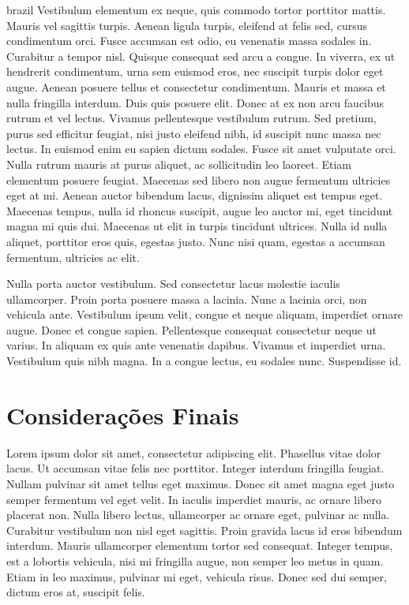 \begin{otherlanguage*}{brazil}
        Vestibulum elementum ex neque, quis commodo tortor porttitor
        mattis. Mauris vel sagittis turpis. Aenean ligula turpis, eleifend at felis sed, cursus
        condimentum orci. Fusce accumsan est odio, eu venenatis massa sodales in. Curabitur a tempor
        nisl. Quisque consequat sed arcu a congue. In viverra, ex ut hendrerit condimentum, urna sem
        euismod eros, nec suscipit turpis dolor eget augue. Aenean posuere tellus et consectetur
        condimentum. Mauris et massa et nulla fringilla interdum. Duis quis posuere elit. Donec at
        ex non arcu faucibus rutrum et vel lectus. Vivamus pellentesque vestibulum rutrum. Sed
        pretium, purus sed efficitur feugiat, nisi justo eleifend nibh, id suscipit nunc massa nec
        lectus. In euismod enim eu sapien dictum sodales. Fusce sit amet vulputate orci. Nulla
        rutrum mauris at purus aliquet, ac sollicitudin leo laoreet. Etiam elementum posuere
        feugiat. Maecenas sed libero non augue fermentum ultricies eget at mi. Aenean auctor
        bibendum lacus, dignissim aliquet est tempus eget. Maecenas tempus, nulla id rhoncus
        suscipit, augue leo auctor mi, eget tincidunt magna mi quis dui. Maecenas ut elit in turpis
        tincidunt ultrices. Nulla id nulla aliquet, porttitor eros quis, egestas justo. Nunc nisi
        quam, egestas a accumsan fermentum, ultricies ac elit.

        Nulla porta auctor vestibulum. Sed
        consectetur lacus molestie iaculis ullamcorper. Proin porta posuere massa a lacinia. Nunc a
        lacinia orci, non vehicula ante. Vestibulum ipsum velit, congue et neque aliquam, imperdiet
        ornare augue. Donec et congue sapien. Pellentesque consequat consectetur neque ut varius. In
        aliquam ex quis ante venenatis dapibus. Vivamus et imperdiet urna. Vestibulum quis nibh
        magna. In a congue lectus, eu sodales nunc. Suspendisse id.

        \section*{Considerações Finais}
        Lorem ipsum dolor sit amet, consectetur adipiscing elit. Phasellus vitae dolor lacus. Ut
        accumsan vitae felis nec porttitor. Integer interdum fringilla feugiat. Nullam pulvinar sit
        amet tellus eget maximus. Donec sit amet magna eget justo semper fermentum vel eget velit.
        In iaculis imperdiet mauris, ac ornare libero placerat non. Nulla libero lectus, ullamcorper
        ac ornare eget, pulvinar ac nulla. Curabitur vestibulum non nisl eget sagittis. Proin
        gravida lacus id eros bibendum interdum. Mauris ullamcorper elementum tortor sed consequat.
        Integer tempus, est a lobortis vehicula, nisi mi fringilla augue, non semper leo metus in
        quam. Etiam in leo maximus, pulvinar mi eget, vehicula risus. Donec sed dui semper, dictum
        eros at, suscipit felis.


\end{otherlanguage*}
